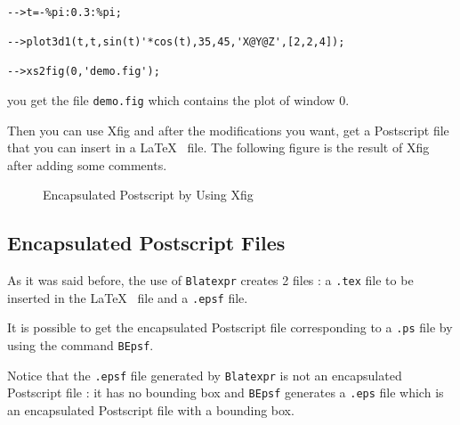 \begin{verbatim}

-->t=-%pi:0.3:%pi;
 
-->plot3d1(t,t,sin(t)'*cos(t),35,45,'X@Y@Z',[2,2,4]);
 
-->xs2fig(0,'demo.fig');   

\end{verbatim}

you get the file {\tt demo.fig} which contains the plot 
of window 0. 

Then you can use Xfig and after the modifications you want, get a Postscript 
file that you can insert in a \LaTeX~ file. The following figure is the result
of Xfig after adding some comments.

\begin{figure}
\caption{Encapsulated Postscript by Using Xfig}
\label{xfig2ps}
\end{figure}


\subsection{Encapsulated Postscript Files}
As it was said before, the use of {\tt Blatexpr} creates 2 files : a 
{\tt .tex} file to be inserted in the \LaTeX~ file and a {\tt .epsf} file.

It is possible to get the encapsulated Postscript file corresponding to a 
{\tt .ps} file by using the command {\tt BEpsf}.

Notice that the {\tt .epsf} file generated by {\tt Blatexpr} is not an 
encapsulated Postscript file : it has no bounding box and {\tt BEpsf}
generates a {\tt .eps} file which is an encapsulated Postscript file with 
a bounding box.
